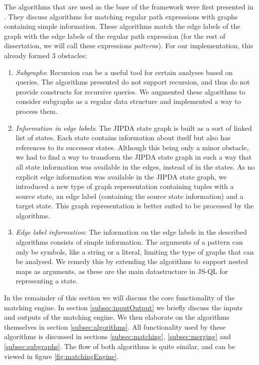 The algorithms that are used as the base of the framework were first presented in \cite{algoEngine}. They discuss algorithms for matching regular path expressions with graphs containing simple information. These algorithms match the edge labels of the graph with the edge labels of the regular path expression (for the rest of dissertation, we will call these expressions \textit{pattern}s). For our implementation, this already formed 3 obstacles:
\begin{enumerate}
\item \textit{Subgraphs}: Recursion can be a useful tool for certain analyses based on queries. The algorithms presented do not support recursion, and thus do not provide constructs for recursive queries. We augmented these algorithms to consider subgraphs as a regular data structure and implemented a way to process them.
\item \textit{Information in edge labels}: The JIPDA state graph is built as a sort of linked list of states. Each state contains information about itself but also has references to its successor states. Although this being only a minor obstacle, we had to find a way to transform the JIPDA state graph in such a way that all state information was available in the edges, instead of in the states. As no explicit edge information was available in the JIPDA state graph, we introduced a new type of graph representation containing tuples with a source state, an edge label (containing the source state information) and a target state. This graph representation is better suited to be processed by the algorithms.
\item \textit{Edge label information}: The information on the edge labels in the described algorithms consists of simple information. The arguments of a pattern can only be symbols, like a string or a literal, limiting the type of graphs that can be analysed. We remedy this by extending the algorithms to support nested maps as arguments, as these are the main datastructure in JS-QL for representing a state.
\end{enumerate}


In the remainder of this section we will discuss the core functionality of the matching engine. In section \ref{subsec:inputOutput} we briefly discuss the inputs and outputs of the matching engine. We then elaborate on the algorithms themselves in section \ref{subsec:algorithms}. All functionality used by these algorithms is discussed in sections \ref{subsec:matching}, \ref{subsec:merging} and \ref{subsec:subgraphs}. The flow of both algorithms is quite similar, and can be viewed in figure \ref{fig:matchingEngine}.

